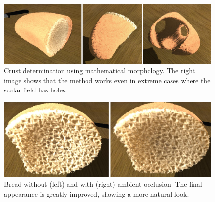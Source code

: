 \begin{figure}
  \centerline{\includegraphics[width=13cm]{figures/crusts}}
  \caption{Crust determination using mathematical morphology. The right image shows that the method works even in extreme cases where the scalar field has holes. }
  \label{fg:crusts}
\end{figure}

\begin{figure}
\centerline{\includegraphics[width=13cm]{figures/occlusion}}
  \caption{Bread without (left) and with (right) ambient occlusion. The final appearance is greatly improved, showing a more natural look. }
  \label{fg:occlusion}
\end{figure}
